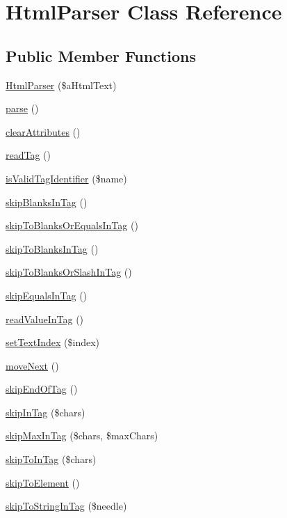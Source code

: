 \hypertarget{classHtmlParser}{\section{Html\+Parser Class Reference}
\label{classHtmlParser}
}
\subsection*{Public Member Functions}
\begin{DoxyCompactItemize}
\item 
\hyperlink{classHtmlParser_aaaba84803935c8ae10a75905cee57d65}{Html\+Parser} (\$a\+Html\+Text)
\item 
\hyperlink{classHtmlParser_a4856b59f41119d6c99293c94ac7f849e}{parse} ()
\item 
\hyperlink{classHtmlParser_acccd984ae2892532c174f83cfce2a546}{clear\+Attributes} ()
\item 
\hyperlink{classHtmlParser_a094c54a55dac28717219395632157f91}{read\+Tag} ()
\item 
\hyperlink{classHtmlParser_ac27d7cc3a6ee1b53b40d2fb92583e13a}{is\+Valid\+Tag\+Identifier} (\$name)
\item 
\hyperlink{classHtmlParser_af532c05234a2be1926dec4cdf77d6c49}{skip\+Blanks\+In\+Tag} ()
\item 
\hyperlink{classHtmlParser_a7a720f77d00fb3eb0251c37596fccb3d}{skip\+To\+Blanks\+Or\+Equals\+In\+Tag} ()
\item 
\hyperlink{classHtmlParser_a2eab30ed5702c86e12a397cce19d17c2}{skip\+To\+Blanks\+In\+Tag} ()
\item 
\hyperlink{classHtmlParser_a8df2144345dd99e10dfb391d8b3d2ee1}{skip\+To\+Blanks\+Or\+Slash\+In\+Tag} ()
\item 
\hyperlink{classHtmlParser_a8546d5a27c483d4dd43d2e4765d7cfef}{skip\+Equals\+In\+Tag} ()
\item 
\hyperlink{classHtmlParser_a739dd3ad8fd8af0219d2906ec99ac8f1}{read\+Value\+In\+Tag} ()
\item 
\hyperlink{classHtmlParser_a416a94c73a453c71af681e1bdf70853e}{set\+Text\+Index} (\$index)
\item 
\hyperlink{classHtmlParser_a307eebf6aef76875f58b7fc6b351c492}{move\+Next} ()
\item 
\hyperlink{classHtmlParser_a5acaf0e2dfc657499dcd33ee8755faa4}{skip\+End\+Of\+Tag} ()
\item 
\hyperlink{classHtmlParser_a406c613a90a8275f58ceba60fc71cb3c}{skip\+In\+Tag} (\$chars)
\item 
\hyperlink{classHtmlParser_a9f920ced9cab65de6bb821cbb80eba08}{skip\+Max\+In\+Tag} (\$chars, \$max\+Chars)
\item 
\hyperlink{classHtmlParser_a3979d78cab15dd09ca10c0ee9c5cf8f6}{skip\+To\+In\+Tag} (\$chars)
\item 
\hyperlink{classHtmlParser_a41e6073b3428c41205dc4db9834ce4b0}{skip\+To\+Element} ()
\item 
\hyperlink{classHtmlParser_a2b94710bc71fd456f7a481854984a030}{skip\+To\+String\+In\+Tag} (\$needle)
\end{DoxyCompactItemize}
